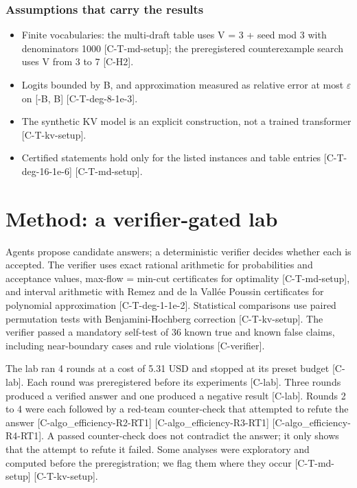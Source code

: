 \documentclass[10pt,twocolumn]{article}
\begin{document}
\subsubsection*{Assumptions that carry the results}

\begin{itemize}
\item Finite vocabularies: the multi-draft table uses V = 3 + seed mod 3 with denominators 1000 {\scriptsize[C-T-md-setup]}; the preregistered counterexample search uses V from 3 to 7 {\scriptsize[C-H2]}.
\item Logits bounded by B, and approximation measured as relative error at most $\varepsilon$ on [-B, B] {\scriptsize[C-T-deg-8-1e-3]}.
\item The synthetic KV model is an explicit construction, not a trained transformer {\scriptsize[C-T-kv-setup]}.
\item Certified statements hold only for the listed instances and table entries {\scriptsize[C-T-deg-16-1e-6]} {\scriptsize[C-T-md-setup]}.
\end{itemize}

\section{Method: a verifier-gated lab}

Agents propose candidate answers; a deterministic verifier decides whether each is accepted. The verifier uses exact rational arithmetic for probabilities and acceptance values, max-flow = min-cut certificates for optimality {\scriptsize[C-T-md-setup]}, and interval arithmetic with Remez and de la Vallée Poussin certificates for polynomial approximation {\scriptsize[C-T-deg-1-1e-2]}. Statistical comparisons use paired permutation tests with Benjamini-Hochberg correction {\scriptsize[C-T-kv-setup]}. The verifier passed a mandatory self-test of 36 known true and known false claims, including near-boundary cases and rule violations {\scriptsize[C-verifier]}.

The lab ran 4 rounds at a cost of 5.31 USD and stopped at its preset budget {\scriptsize[C-lab]}. Each round was preregistered before its experiments {\scriptsize[C-lab]}. Three rounds produced a verified answer and one produced a negative result {\scriptsize[C-lab]}. Rounds 2 to 4 were each followed by a red-team counter-check that attempted to refute the answer {\scriptsize[C-algo\_efficiency-R2-RT1]} {\scriptsize[C-algo\_efficiency-R3-RT1]} {\scriptsize[C-algo\_efficiency-R4-RT1]}. A passed counter-check does not contradict the answer; it only shows that the attempt to refute it failed. Some analyses were exploratory and computed before the preregistration; we flag them where they occur {\scriptsize[C-T-md-setup]} {\scriptsize[C-T-kv-setup]}.
\end{document}
